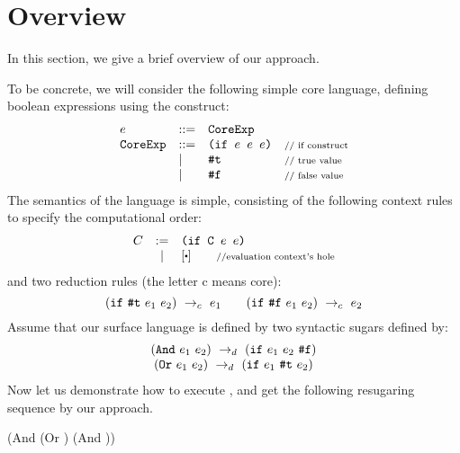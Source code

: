 \section{Overview}
\label{sec2}


In this section, we give a brief overview of our approach. 

To be concrete, we will consider the following simple core language, defining boolean expressions using the  construct:
\[
\begin{array}{lllll}
e &::=& \mbox{\tt CoreExp}\\
\mbox{\tt CoreExp} &::=& \texttt{(if~$e$~$e$~$e$)} &\mbox{{\scriptsize // if construct}}\\
& |& \mbox{\tt \#t}  & \mbox{{\scriptsize // true value}}\\
& |& \mbox{\tt \#f} & \mbox{{\scriptsize // false value}}
\end{array}
\]
The semantics of the language is simple, consisting of the following context rules to specify the computational order:
\[
\begin{array}{lcl}
C &:=& \Code{(if C $e$ $e$)}\\
&|&[\bigcdot] \qquad \note{//evaluation context's hole}\\
\end{array}
\]
and two reduction rules (the letter c means core):
\[
\centering
 \redc{(\m{if}~\m{\true}~e_1~e_2)}{e_1}  \qquad \redc{(\m{if}~\m{\false}~e_1~e_2)}{e_2}
\]
Assume that our surface language is defined by two syntactic sugars defined by:
\[
\begin{array}{c}
(\mbox{\tt And}~e_1~e_2) ~\rightarrow_d~ (\mbox{\tt if}~e_1~e_2~\mbox{\tt \#f})\\
(\mbox{\tt Or}~e_1~e_2) ~\rightarrow_d~ (\mbox{\tt if}~e_1~\mbox{\tt \#t}~e_2)
\end{array}
\]
Now let us demonstrate how to execute , and get the following resugaring sequence by our approach.
{\small
\begin{Codes}
    (And (Or \true \false) (And \false \true))
\end{Codes}
}

